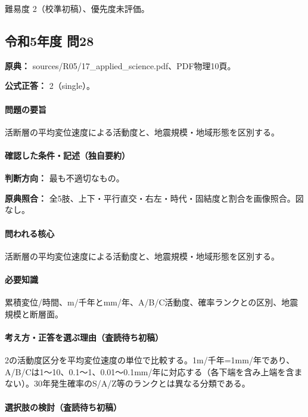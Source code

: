 \par 難易度 2（校準初稿）、優先度未評価。

\subsection{令和5年度 問28}
\label{q:r05-reg-applied-28}

\noindent\textbf{原典：} sources/R05/17\_applied\_science.pdf、PDF物理10頁。

\textbf{公式正答：} 2（single）。

\paragraph{問題の要旨} 活断層の平均変位速度による活動度と、地震規模・地域形態を区別する。

\paragraph{確認した条件・記述（独自要約）}\mbox{}\par

\noindent\textbf{判断方向：} 最も不適切なもの。\par

\noindent\textbf{原典照合：} 全5肢、上下・平行直交・右左・時代・固結度と割合を画像照合。図なし。\par

\paragraph{問われる核心} 活断層の平均変位速度による活動度と、地震規模・地域形態を区別する。

\paragraph{必要知識} 累積変位/時間、m/千年とmm/年、A/B/C活動度、確率ランクとの区別、地震規模と断層面。

\paragraph{考え方・正答を選ぶ理由（査読待ち初稿）} 2の活動度区分を平均変位速度の単位で比較する。1m/千年=1mm/年であり、A/B/Cは1〜10、0.1〜1、0.01〜0.1mm/年に対応する（各下端を含み上端を含まない）。30年発生確率のS/A/Z等のランクとは異なる分類である。

\paragraph{選択肢の検討（査読待ち初稿）}\mbox{}\par

